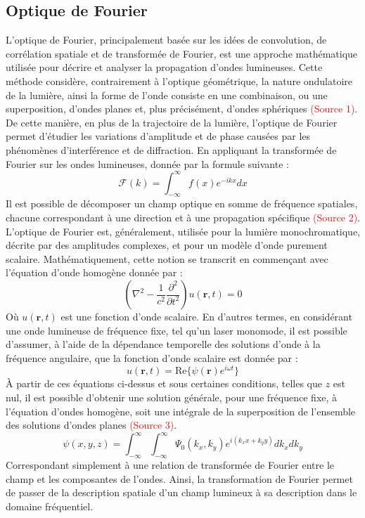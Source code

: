\documentclass[11pt,letterpaper]{article}
\begin{document}
\subsection{Optique de Fourier}\label{Fourier_optic}
L'optique de Fourier, principalement basée sur les idées de convolution, de corrélation spatiale et de transformée de Fourier, est une approche mathématique utilisée pour décrire et analyser la propagation d'ondes lumineuses. Cette méthode considère, contrairement à l'optique géométrique, la nature ondulatoire de la lumière, ainsi la forme de l'onde consiste en une combinaison, ou une superposition, d'ondes planes et, plus précisément, d'ondes sphériques \textcolor{red}{(Source 1)}. De cette manière, en plus de la trajectoire de la lumière, l'optique de Fourier permet d'étudier les variations d'amplitude et de phase causées par les phénomènes d'interférence et de diffraction. En appliquant la transformée de Fourier sur les ondes lumineuses, donnée par la formule suivante :
\begin{equation}
  \mathcal{F}(k)=\int_{-\infty}^{\infty}f(x)e^{-ikx}dx
\end{equation}
Il est possible de décomposer un champ optique en somme de fréquence spatiales, chacune correspondant à une direction et à une propagation spécifique \textcolor{red}{(Source 2)}. L'optique de Fourier est, généralement, utilisée pour la lumière monochromatique, décrite  par des amplitudes complexes, et pour un modèle d'onde purement scalaire. Mathématiquement, cette notion se transcrit en commençant avec l'équation d'onde homogène donnée par :
\begin{equation}
  \left(\nabla^{2}-\frac{1}{c^{2}}\frac{\partial^{2}}{\partial t^{2}}\right)u(\mathbf{r}, t)=0
\end{equation}
Où $u(\mathbf{r}, t)$ est une fonction d'onde scalaire. En d'autres termes, en considérant une onde lumineuse de fréquence fixe, tel qu'un laser monomode, il est possible d'assumer, à l'aide de la dépendance temporelle des solutions d'onde à la fréquence angulaire, que la fonction d'onde scalaire est donnée par :
\begin{equation}
  u(\mathbf{r}, t)=\mathrm{Re}\{\psi(\mathbf{r})e^{i\omega t}\}
\end{equation}
À partir de ces équations ci-dessus et sous certaines conditions, telles que $z$ est nul, il est possible d'obtenir une solution générale, pour une fréquence fixe, à l'équation d'ondes homogène, soit une intégrale de la superposition de l'ensemble des solutions d'ondes planes \textcolor{red}{(Source 3)}.
\begin{equation}
  \psi(x, y, z)=\int_{-\infty}^{\infty}\int_{-\infty}^{\infty}\Psi_{0}(k_{x},k_{y})e^{i(k_{x}x+k_{y}y)}dk_{x}dk_{y}
\end{equation}
Correspondant simplement à une relation de transformée de Fourier entre le champ et les composantes de l'ondes. Ainsi, la transformation de Fourier permet de passer de la description spatiale d’un champ lumineux à sa description dans le domaine fréquentiel.
\end{document}
